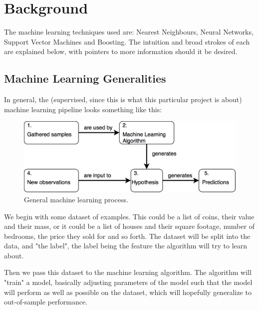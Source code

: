 \documentclass[a4paper, 12pt]{article}
\begin{document}
    \newpage

    \section{Background}

        \par The machine learning techniques used are: Nearest Neighbours, Neural Networks, Support Vector Machines and Boosting. The intuition and broad strokes of each are explained below, with pointers to more information should it be desired.
        
        \subsection{Machine Learning Generalities}
        
            \par In general, the (supervised, since this is what this particular project is about) machine learning pipeline looks something like this:
            
                \begin{figure}[h]
                    \caption{General machine learning process.}
                    \includegraphics[width=\textwidth]{machineLearningGeneralNotion}
                \end{figure}
                
            \par We begin with some dataset of examples. This could be a list of coins, their value and their mass, or it could be a list of houses and their square footage, number of bedrooms, the price they sold for and so forth. The dataset will be split into the data, and "the label", the label being the feature the algorithm will try to learn about. 
            
            \par Then we pass this dataset to the machine learning algorithm. The algorithm will "train" a model, basically adjusting parameters of the model such that the model will perform as well as possible on the dataset, which will hopefully generalize to out-of-sample performance. 
            
\end{document}
